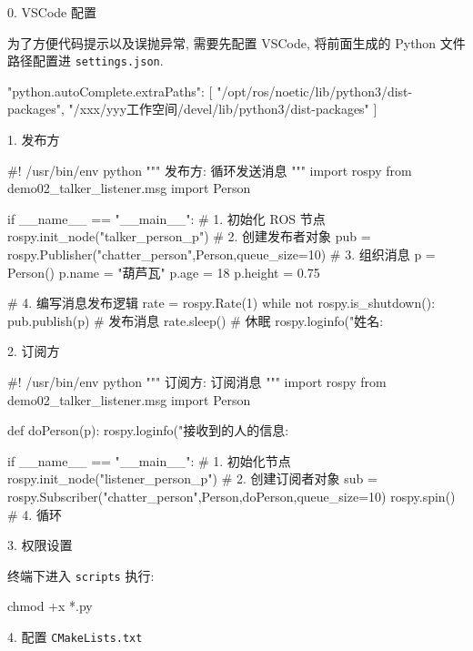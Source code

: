\documentclass[openany, fontset=windowsold]{ctexbook}
\theoremstyle{kaiti}
\theoremstyle{normal}
\begin{document}
0. VSCode 配置

为了方便代码提示以及误抛异常, 需要先配置 VSCode, 将前面生成的  Python 文件路径配置进 \verb|settings.json|.

\begin{xml}
  {
      "python.autoComplete.extraPaths": [
          "/opt/ros/noetic/lib/python3/dist-packages",
          "/xxx/yyy工作空间/devel/lib/python3/dist-packages"
      ]
  }
\end{xml}

1. 发布方

\begin{python}
  #! /usr/bin/env python
  """
      发布方:
          循环发送消息
  """
  import rospy
  from demo02_talker_listener.msg import Person

  if __name__ == "__main__":
      # 1. 初始化 ROS 节点
      rospy.init_node("talker_person_p")
      # 2. 创建发布者对象
      pub = rospy.Publisher("chatter_person",Person,queue_size=10)
      # 3. 组织消息
      p = Person()
      p.name = "葫芦瓦"
      p.age = 18
      p.height = 0.75

      # 4. 编写消息发布逻辑
      rate = rospy.Rate(1)
      while not rospy.is_shutdown():
          pub.publish(p)  # 发布消息
          rate.sleep()  # 休眠
          rospy.loginfo("姓名:%
\end{python}

2. 订阅方

\begin{python}
  #! /usr/bin/env python
  """
      订阅方:
          订阅消息
  """
  import rospy
  from demo02_talker_listener.msg import Person

  def doPerson(p):
      rospy.loginfo("接收到的人的信息:%

  if __name__ == "__main__":
      # 1. 初始化节点
      rospy.init_node("listener_person_p")
      # 2. 创建订阅者对象
      sub = rospy.Subscriber("chatter_person",Person,doPerson,queue_size=10)
      rospy.spin() # 4. 循环
\end{python}

3. 权限设置

终端下进入 \verb|scripts| 执行:

\begin{bash}
  chmod +x *.py
\end{bash}

4. 配置 \verb|CMakeLists.txt|

\end{document}
